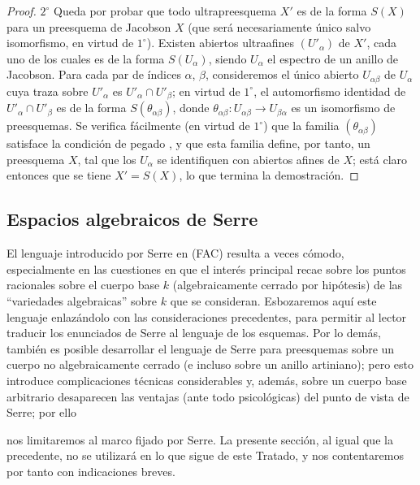 \begin{proof}
$2^\circ$ Queda por probar que todo ultrapreesquema $X'$ es de la forma $S(X)$ para un preesquema de Jacobson $X$ (que será necesariamente único salvo isomorfismo, en virtud de $1^\circ$).
Existen abiertos ultraafines $(U'_\alpha)$ de $X'$, cada uno de los cuales es de la forma $S(U_\alpha)$, siendo $U_\alpha$ el espectro de un anillo de Jacobson.
Para cada par de índices $\alpha$, $\beta$, consideremos el único abierto $U_{\alpha\beta}$ de $U_\alpha$ cuya traza sobre $U'_\alpha$ es $U'_\alpha\cap U'_\beta$; en virtud de $1^\circ$, el automorfismo identidad de $U'_\alpha\cap U'_\beta$ es de la forma $S(\theta_{\alpha\beta})$, donde $\theta_{\alpha\beta}:U_{\alpha\beta}\to U_{\beta\alpha}$ es un isomorfismo de preesquemas.
Se verifica fácilmente (en virtud de $1^\circ$) que la familia $(\theta_{\alpha\beta})$ satisface la condición de pegado , y que esta familia define, por tanto, un preesquema $X$, tal que los $U_\alpha$ se identifiquen con abiertos afines de $X$; está claro entonces que se tiene $X'=S(X)$, lo que termina la demostración.
\end{proof}

\subsection{Espacios algebraicos de Serre}
\label{subsection:IV.10.10}

\begin{env}[10.10.1]
\label{IV.10.10.1}
El lenguaje introducido por Serre en (FAC) resulta a veces cómodo, especialmente en las cuestiones en que el interés principal recae sobre los puntos racionales sobre el cuerpo base $k$ (algebraicamente cerrado por hipótesis) de las ``variedades algebraicas'' sobre $k$ que se consideran.
Esbozaremos aquí este lenguaje enlazándolo con las consideraciones precedentes, para permitir al lector traducir los enunciados de Serre al lenguaje de los esquemas.
Por lo demás, también es posible desarrollar el lenguaje de Serre para preesquemas sobre un cuerpo no algebraicamente cerrado (e incluso sobre un anillo artiniano); pero esto introduce complicaciones técnicas considerables y, además, sobre un cuerpo base arbitrario desaparecen las ventajas (ante todo psicológicas) del punto de vista de Serre; por ello 


nos limitaremos al marco fijado por Serre.
La presente sección, al igual que la precedente, no se utilizará en lo que sigue de este Tratado, y nos contentaremos por tanto con indicaciones breves.
\end{env}




